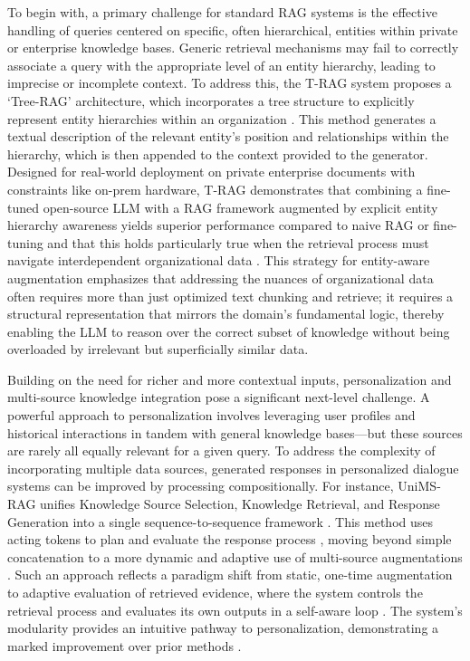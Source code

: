 \documentclass[11pt]{article}
\begin{document}
To begin with, a primary challenge for standard RAG systems is the effective handling of queries centered on specific, often hierarchical, entities within private or enterprise knowledge bases. Generic retrieval mechanisms may fail to correctly associate a query with the appropriate level of an entity hierarchy, leading to imprecise or incomplete context. To address this, the T-RAG system proposes a `Tree-RAG' architecture, which incorporates a tree structure to explicitly represent entity hierarchies within an organization \cite{ref218}. This method generates a textual description of the relevant entity's position and relationships within the hierarchy, which is then appended to the context provided to the generator. Designed for real-world deployment on private enterprise documents with constraints like on-prem hardware, T-RAG demonstrates that combining a fine-tuned open-source LLM with a RAG framework augmented by explicit entity hierarchy awareness yields superior performance compared to naive RAG or fine-tuning and that this holds particularly true when the retrieval process must navigate interdependent organizational data \cite{ref218}. This strategy for entity-aware augmentation emphasizes that addressing the nuances of organizational data often requires more than just optimized text chunking and retrieve; it requires a structural representation that mirrors the domain's fundamental logic, thereby enabling the LLM to reason over the correct subset of knowledge without being overloaded by irrelevant but superficially similar data.

Building on the need for richer and more contextual inputs, personalization and multi-source knowledge integration pose a significant next-level challenge. A powerful approach to personalization involves leveraging user profiles and historical interactions in tandem with general knowledge bases---but these sources are rarely all equally relevant for a given query. To address the complexity of incorporating multiple data sources, generated responses in personalized dialogue systems can be improved by processing compositionally. For instance, UniMS-RAG unifies Knowledge Source Selection, Knowledge Retrieval, and Response Generation into a single sequence-to-sequence framework \cite{ref219}. This method uses acting tokens to plan and evaluate the response process \cite{ref219}, moving beyond simple concatenation to a more dynamic and adaptive use of multi-source augmentations \cite{ref219}. Such an approach reflects a paradigm shift from static, one-time augmentation to adaptive evaluation of retrieved evidence, where the system controls the retrieval process and evaluates its own outputs in a self-aware loop \cite{ref219}. The system's modularity provides an intuitive pathway to personalization, demonstrating a marked improvement over prior methods \cite{ref219}.
\end{document}
